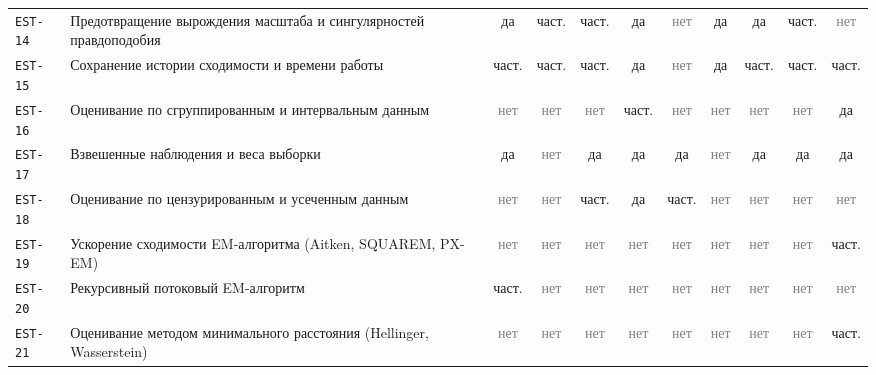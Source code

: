 \documentclass[10pt,a4paper]{article}
\begin{document}
\begin{landscape}
{\begin{longtable}{@{}l >{\raggedright\arraybackslash}p{8.0cm} *{9}{c}@{}}
\texttt{EST-14} & Предотвращение вырождения масштаба и сингулярностей правдоподобия & \cellcolor{yes!30}да & \cellcolor{part!40}част. & \cellcolor{part!40}част. & \cellcolor{yes!30}да & \textcolor{gray}{нет} & \cellcolor{yes!30}да & \cellcolor{yes!30}да & \cellcolor{part!40}част. & \textcolor{gray}{нет} \\
\texttt{EST-15} & Сохранение истории сходимости и времени работы & \cellcolor{part!40}част. & \cellcolor{part!40}част. & \cellcolor{part!40}част. & \cellcolor{yes!30}да & \textcolor{gray}{нет} & \cellcolor{yes!30}да & \cellcolor{part!40}част. & \cellcolor{part!40}част. & \cellcolor{part!40}част. \\
\texttt{EST-16} & Оценивание по сгруппированным и интервальным данным & \textcolor{gray}{нет} & \textcolor{gray}{нет} & \textcolor{gray}{нет} & \cellcolor{part!40}част. & \textcolor{gray}{нет} & \textcolor{gray}{нет} & \textcolor{gray}{нет} & \textcolor{gray}{нет} & \cellcolor{yes!30}да \\
\texttt{EST-17} & Взвешенные наблюдения и веса выборки & \cellcolor{yes!30}да & \textcolor{gray}{нет} & \cellcolor{yes!30}да & \cellcolor{yes!30}да & \cellcolor{yes!30}да & \textcolor{gray}{нет} & \cellcolor{yes!30}да & \cellcolor{yes!30}да & \cellcolor{yes!30}да \\
\texttt{EST-18} & Оценивание по цензурированным и усеченным данным & \textcolor{gray}{нет} & \textcolor{gray}{нет} & \cellcolor{part!40}част. & \cellcolor{yes!30}да & \cellcolor{part!40}част. & \textcolor{gray}{нет} & \textcolor{gray}{нет} & \textcolor{gray}{нет} & \textcolor{gray}{нет} \\
\texttt{EST-19} & Ускорение сходимости EM-алгоритма (Aitken, SQUAREM, PX-EM) & \textcolor{gray}{нет} & \textcolor{gray}{нет} & \textcolor{gray}{нет} & \textcolor{gray}{нет} & \textcolor{gray}{нет} & \textcolor{gray}{нет} & \textcolor{gray}{нет} & \textcolor{gray}{нет} & \cellcolor{part!40}част. \\
\texttt{EST-20} & Рекурсивный потоковый EM-алгоритм & \cellcolor{part!40}част. & \textcolor{gray}{нет} & \textcolor{gray}{нет} & \textcolor{gray}{нет} & \textcolor{gray}{нет} & \textcolor{gray}{нет} & \textcolor{gray}{нет} & \textcolor{gray}{нет} & \textcolor{gray}{нет} \\
\texttt{EST-21} & Оценивание методом минимального расстояния (Hellinger, Wasserstein) & \textcolor{gray}{нет} & \textcolor{gray}{нет} & \textcolor{gray}{нет} & \textcolor{gray}{нет} & \textcolor{gray}{нет} & \textcolor{gray}{нет} & \textcolor{gray}{нет} & \textcolor{gray}{нет} & \cellcolor{part!40}част. \\

\end{longtable}}
\end{landscape}
\end{document}
